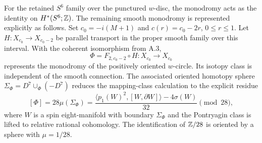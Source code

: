 \begin{proposition}[E.2.2; Proved]\label{st:E.2.2}
For the retained $S^6$ family over the punctured $w$-disc, the
monodromy acts as the identity on $H^*(S^6;\mathbb Z)$. The remaining
smooth monodromy is represented explicitly as follows. Set
$c_0=-i(M+1)$ and $c(r)=c_0-2r$, $0\leq r\leq1$. Let
$H:X_{c_0}\to X_{c_0-2}$ be parallel transport in the proper smooth
family over this interval. With the coherent isomorphism from A.3,
\[
       \Phi=F_{2,c_0-2}\circ H:X_{c_0}\longrightarrow X_{c_0}  \tag{E9}
\]
represents the monodromy of the positively oriented $w$-circle.
Its isotopy class is independent of the smooth connection. The
associated oriented homotopy sphere
$\Sigma_\Phi=D^7\cup_\Phi(-D^7)$ reduces the mapping-class
calculation to the explicit residue
\[
  [\Phi]=28\mu(\Sigma_\Phi)
    =\frac{\langle p_1(W)^2,[W,\partial W]\rangle
                 -4\sigma(W)}{32}\pmod {28},                 \tag{E10}
\]
where $W$ is a spin eight-manifold with boundary $\Sigma_\Phi$ and
the Pontryagin class is lifted to relative rational cohomology.
The identification of $\mathbb Z/28$ is oriented by a sphere with
$\mu=1/28$.
\end{proposition}

